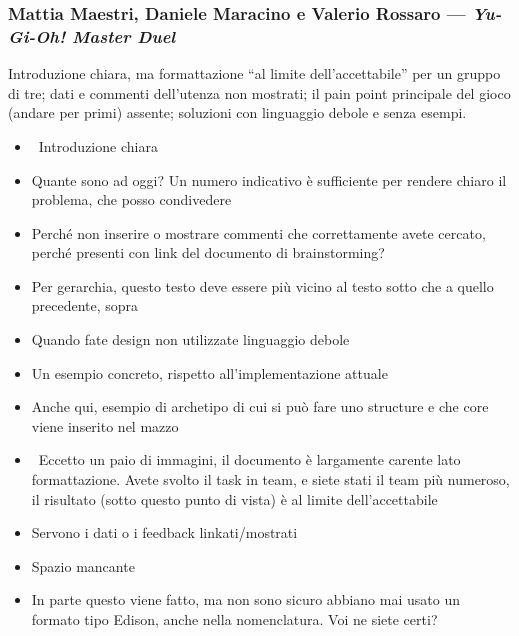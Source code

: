 \subsubsection{Mattia Maestri, Daniele Maracino e Valerio Rossaro ---
\emph{Yu-Gi-Oh! Master Duel}}
Introduzione chiara, ma formattazione ``al limite dell'accettabile'' per un
gruppo di tre; dati e commenti dell'utenza non mostrati; il pain point
principale del gioco (andare per primi) assente; soluzioni con linguaggio
debole e senza esempi.
{\small
\begin{itemize}
  \item {} \rvBene\ Introduzione chiara
  \item {} Quante sono ad oggi? Un numero indicativo è sufficiente per rendere chiaro il problema, che posso condivedere
  \item {} Perché non inserire o mostrare commenti che correttamente avete cercato, perché presenti con link del documento di brainstorming?
  \item {} Per gerarchia, questo testo deve essere più vicino al testo sotto che a quello precedente, sopra
  \item {} Quando fate design non utilizzate linguaggio debole
  \item {} Un esempio concreto, rispetto all'implementazione attuale
  \item {} Anche qui, esempio di archetipo di cui si può fare uno structure e che core viene inserito nel mazzo
  \item {} \rvAvviso\ Eccetto un paio di immagini, il documento è largamente carente lato formattazione. Avete svolto il task in team, e siete stati il team più numeroso, il risultato (sotto questo punto di vista) è al limite dell'accettabile
  \item {} Servono i dati o i feedback linkati/mostrati
  \item \rvAncora{,} Spazio mancante
  \item {} In parte questo viene fatto, ma non sono sicuro abbiano mai usato un formato tipo Edison, anche nella nomenclatura. Voi ne siete certi?

\end{itemize}}
